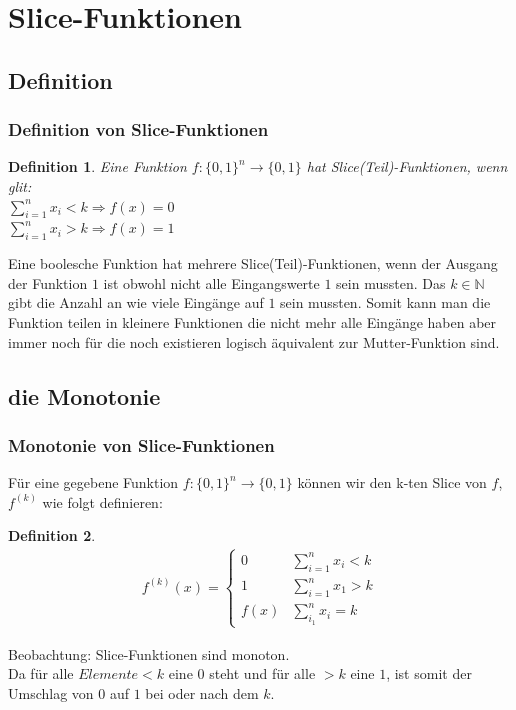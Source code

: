 \documentclass[hyperref={pdfpagelabels=false}]{beamer} %
\newtheorem{defin}{Definition}
\begin{document}
  \section{Slice-Funktionen}
  \subsection*{Definition}
  \begin{frame}%
    \frametitle{Definition von Slice-Funktionen}
    \begin{defin}
      Eine Funktion $f:\{0,1\}^n \rightarrow \{0,1\}$ hat Slice(Teil)-Funktionen, wenn glit:\\

      $\sum_{i=1}^{n} x_i<k\Rightarrow f(x)=0$\\

      $\sum_{i=1}^{n} x_i>k\Rightarrow f(x)=1$\\
    \end{defin}
    Eine boolesche Funktion hat mehrere Slice(Teil)-Funktionen, wenn der Ausgang der Funktion $1$ ist obwohl nicht alle Eingangswerte $1$ sein mussten.
    Das $k \in \mathbb{N}$ gibt die Anzahl an wie viele Eing\"ange auf $1$ sein mussten.
    Somit kann man die Funktion teilen in kleinere Funktionen die nicht mehr alle Eing\"ange haben aber immer noch f\"ur die noch existieren logisch \"aquivalent zur Mutter-Funktion sind.
  \end{frame}

  \subsection*{die Monotonie}
  \begin{frame}
    \frametitle{Monotonie von Slice-Funktionen}
    Für eine gegebene Funktion $f:\{0,1\}^n \rightarrow \{0,1\}$ können wir den k-ten Slice von $f$,
    $f^{(k)}$ wie folgt definieren:\\
    \begin{defin}
      \begin{align*}
        f^{(k)}(x) =
        \begin{cases}
          0 & \sum\nolimits_{i=1}^{n} x_i < k\\
          1 & \sum\nolimits_{i=1}^{n} x_1 > k\\
          f(x) &\sum\nolimits_{i_1}^{n} x_i = k
        \end{cases}
      \end{align*}
    \end{defin}
    Beobachtung: Slice-Funktionen sind monoton.\\
    Da für alle $Elemente < k$ eine $0$ steht und für alle $> k$ eine $1$, ist somit der Umschlag von $0$ auf $1$ bei oder nach dem $k$.
  \end{frame}
\end{document}
